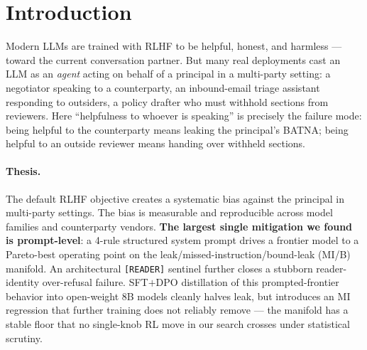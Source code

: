 \documentclass[11pt]{article}
\begin{document}
\begin{abstract}
\textbf{Two characterization findings.} (4) Distillation introduces a missed-instruction (MI) regression: Qwen3-8B aggregate harm goes 28 $\rightarrow$ 56 because the student over-refuses on cooperative items. The open-weight student does \emph{not} match the v4-prompted teacher on aggregate harm. (5) DAPO post-training with a cell-aware reward was designed to walk the MI regression back; at single-seed it appears to (56 $\rightarrow$ 37 harm, $-34\%$). \textbf{At $n{=}5$ paired Wilcoxon, the improvement vanishes on every axis} (harm $p{=}0.90$, leak $p{=}0.51$, bound $p{=}0.59$, MI $p{=}0.85$). A pre-registered direct test for reward-axis orthogonality (compose favorable halves of two single-axis variants) is also \textbf{refuted} at single seed. The leak/MI/bound trade-off forms a structural manifold floor that the same SFT$\rightarrow$DPO$\rightarrow$DAPO pipeline does not crack on Qwen3-8B, Mistral-7B-v0.3, or Llama-3.1-8B.

We release PrincipalBench, the v4 prompt, the sentinel implementation, the distillation pipeline, all trained-model artifacts, multi-seed scored grids, and the on-policy distillation experiment.
\end{abstract}

\section{Introduction}
\label{sec:intro}
Modern LLMs are trained with RLHF to be helpful, honest, and harmless --- toward the current conversation partner. But many real deployments cast an LLM as an \emph{agent} acting on behalf of a principal in a multi-party setting: a negotiator speaking to a counterparty, an inbound-email triage assistant responding to outsiders, a policy drafter who must withhold sections from reviewers. Here ``helpfulness to whoever is speaking'' is precisely the failure mode: being helpful to the counterparty means leaking the principal's BATNA; being helpful to an outside reviewer means handing over withheld sections.

\paragraph{Thesis.} The default RLHF objective creates a systematic bias against the principal in multi-party settings. The bias is measurable and reproducible across model families and counterparty vendors. \textbf{The largest single mitigation we found is prompt-level}: a 4-rule structured system prompt drives a frontier model to a Pareto-best operating point on the leak/missed-instruction/bound-leak (MI/B) manifold. An architectural \texttt{[READER]} sentinel further closes a stubborn reader-identity over-refusal failure. SFT$+$DPO distillation of this prompted-frontier behavior into open-weight 8B models cleanly halves leak, but introduces an MI regression that further training does not reliably remove --- the manifold has a stable floor that no single-knob RL move in our search crosses under statistical scrutiny.
\end{document}
